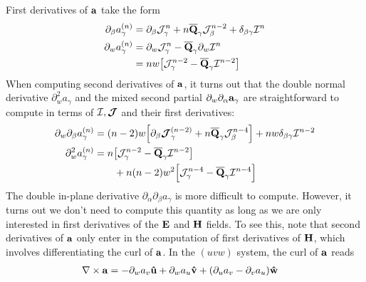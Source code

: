 \documentclass[letterpaper]{article}
\begin{document}
First derivatives of $\mathbf{a}$ take the form
\begin{align*}
 \partial_\beta a_\gamma^{(n)}
&=   \partial_\beta \mathcal{J}^n_\gamma
   + n\overline{\mathbf{Q}}_\gamma \mathcal{J}^{n-2}_\beta
   + \delta_{\beta\gamma} \mathcal{I}^n
\\
 \partial_w a_\gamma^{(n)}
&=   \partial_w \mathcal{J}^n_\gamma
   - \overline{\mathbf{Q}}_\gamma \partial_w \mathcal{I}^n
\\
&=   nw\big[    \mathcal{J}^{n-2}_\gamma
              - \overline{\mathbf{Q}}_\gamma \mathcal{I}^{n-2}
       \big]
\end{align*}
When computing second derivatives of $\mathbf{a}$, it turns
out that the double normal derivative $\partial^2_w a_\gamma$
and the mixed second partial $\partial_w \partial_\alpha \mathbf{a}_\gamma$
are straightforward to compute in terms of $\mathcal{I},\boldsymbol{\mathcal{J}}$
and their first derivatives:
\begin{align*}
 \partial_w \partial_\beta a_\gamma^{(n)}
&= (n-2)w \Big[ \partial_\beta \boldsymbol{\mathcal{J}}_\gamma^{(n-2)}
               +n\overline{\mathbf{Q}}_\gamma \mathcal{J}_\beta^{n-4}
          \Big]
   +nw \delta_{\beta\gamma} \mathcal{I}^{n-2}
\\
 \partial_w^2 a_\gamma^{(n)}
&=   n\big[    \mathcal{J}^{n-2}_\gamma
             - \overline{\mathbf{Q}}_\gamma \mathcal{I}^{n-2}
      \big]
\\
&\qquad
  +n(n-2) w^2 
   \Big[ \mathcal{J}^{n-4}_\gamma -\overline{\mathbf{Q}}_\gamma \mathcal{I}^{n-4}\Big]
\end{align*}
The double in-plane derivative $\partial_\alpha \partial_\beta a_\gamma$ 
is more difficult to compute. However,
it turns out we don't need to compute this quantity as long as 
we are only interested in first derivatives of the 
$\mathbf{E}$ and $\mathbf{H}$ fields. To see this, note that second 
derivatives of $\mathbf{a}$ only enter in the computation of 
first derivatives of $\mathbf{H}$, which involves differentiating
the curl of $\mathbf{a}$. In the $(uvw)$ system, the curl of $\mathbf{a}$ 
reads
\begin{align*}
 \nabla\times \mathbf{a}
 &= -\partial_w a_v \mathbf{\hat u} 
    +\partial_w a_u \mathbf{\hat v} 
    +(\partial_u a_v - \partial_v a_u) \mathbf{\hat w}
\end{align*}
\end{document}
